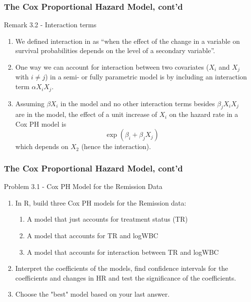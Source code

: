 \documentclass{beamer}
\theoremstyle{definition}
\begin{document}
\begin{frame}
\frametitle{The Cox Proportional Hazard Model, cont'd}
\begin{block}{Remark 3.2 - Interaction terms}
\begin{enumerate}
\item We defined interaction in  as ``when the effect of the change in a variable on survival probabilities depends on the level of a secondary variable''.
\item One way we can account for interaction between two covariates ($X_i$ and $X_j$  with $i \neq j$) in a semi- or fully parametric model is by including an interaction term $\alpha X_iX_j$.
\item Assuming $\beta X_i$ in the model and no other interaction terms besides $\beta_j X_i X_j$ are in the model, the effect of a unit increase of $X_i$ on the hazard rate in a Cox PH model is
\[
\exp(\beta_i + \beta_j X_j)
\]
which depends on $X_2$ (hence the interaction).
\end{enumerate}
\end{block}
\end{frame}

\begin{frame}
\frametitle{The Cox Proportional Hazard Model, cont'd}
\begin{block}{Problem 3.1 - Cox PH Model for the Remission Data}
\begin{enumerate}
\item In R, build three Cox PH models for the Remission data:
\begin{enumerate}[i]
\item A model that just accounts for treatment status (TR)
\item A model that accounts for TR and logWBC
\item A model that accounts for interaction between TR and logWBC
\end{enumerate}
\item Interpret the coefficients of the models, find confidence intervals for the coefficients and changes in HR and test the significance of the coefficients.
\item Choose the "best" model based on your last answer.
\end{enumerate}
\end{block}
\end{frame}
\end{document}
